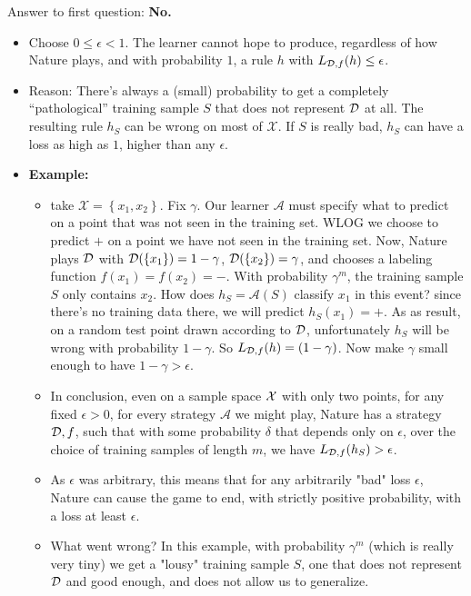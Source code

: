 \documentclass[11pt]{article}
\newcommand{\Ac}{\mathcal{A}}
\newcommand{\Xc}{\mathcal{X}}
\begin{document}
{Answer to first question: {\bf No.}
\begin{itemize}
  \item Choose $0\leq \epsilon <1 $. The learner cannot hope to produce,
    regardless of how Nature plays, and with probability $1$, a
     rule $h$ with $L_{\mathcal{D},f}(h) \leq \epsilon$.
   \item Reason: There's always a (small) probability to get a completely ``pathological'' training
     sample $S$ that does not represent $\mathcal{D}$ at all. The resulting rule $h_S$ can
     be wrong on most of $\Xc$. If $S$ is really bad, $h_S$ can have a loss as
     high as $1$, higher than any $\epsilon$.
   \item {\bf Example: }
   \begin{itemize}
       \item 
   take $\Xc=\left\{ x_1,x_2 \right\}$.  Fix $\gamma$. Our learner $\Ac$ must specify what to predict on a point that was not seen in the training set. WLOG we choose to predict $+$ on a point we have not seen in the training set. Now, Nature plays $\mathcal{D}$ with
     $\mathcal{D}(\{x_1\}) = 1-\gamma$, $\mathcal{D}(\{x_2\}) = \gamma$, and chooses a labeling function $f(x_1)=f(x_2)=-$. 
     With probability
     $\gamma^m$, the training sample $S$ only contains $x_2$. How does $h_S=\Ac(S)$
     classify $x_1$ in this event? since there's no training data there, we will predict $h_S(x_1)=+$.
     As as result, on a random test point drawn according to $\mathcal{D}$, unfortunately $h_S$ will be wrong with probability $1-\gamma$. So
     $L_{\mathcal{D},f}(h)=(1-\gamma)$. Now make $\gamma$ small enough to have $1-\gamma
     > \epsilon$. 
     \item In conclusion, even on a sample space $\mathcal{X}$ with only two points, for any fixed $\epsilon>0$, 
     for every strategy $\Ac$ we might play, Nature has a strategy $\mathcal{D},f$, such that 
     with some probability $\delta$ that depends only on $\epsilon$, over the choice of training samples of length $m$, we have  
     $L_{\mathcal{D},f}(h_S) > \epsilon$.
     \item As $\epsilon$ was arbitrary, this means that for any arbitrarily "bad" loss $\epsilon$, Nature can cause the game to end, with strictly positive probability, with a loss at least $\epsilon$.
     \item What went wrong? In this example, with probability $\gamma^m$ (which is really very tiny) we get a "lousy" training sample $S$, one that does not represent $\mathcal{D}$ and good enough, and does not allow us to generalize. 
     \end{itemize}

\end{itemize}}
\end{document}

